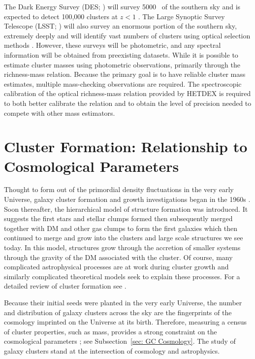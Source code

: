 The Dark Energy Survey (DES; \citealt{DES2005}) will survey 5000 \degsq\ of the southern sky and is expected to detect 100,000 clusters at $z<1$ \citep{DarkEnergySurveyCollaboration2016}. The Large Synoptic Survey Telescope (LSST; \citealt{LSST2012}) will also survey an enormous portion of the southern sky, extremely deeply and will identify vast numbers of clusters using optical selection methods . However, these surveys will be photometric, and any spectral information will be obtained from preexisting datasets. While it is possible to estimate cluster masses using photometric observations, primarily through the richness-mass relation. Because the primary goal is to have reliable cluster mass estimates, multiple mass-checking observations are required. The spectroscopic calibration of the optical richness-mass relation provided by HETDEX is required to both better calibrate the relation and to obtain the level of precision needed to compete with other mass estimators.

\section{Cluster Formation: Relationship to Cosmological Parameters}
Thought to form out of the primordial density fluctuations in the very early Universe, galaxy cluster formation and growth investigations began in the 1960s . Soon thereafter, the hierarchical model of structure formation \citep{Press1974, Gott1975, White1978} was introduced. It suggests the first stars and stellar clumps formed then subsequently merged together with DM and other gas clumps to form the first galaxies which then continued to merge and grow into the clusters and large scale structures we see today. In this model, structures grow through the accretion of smaller systems through the gravity of the DM associated with the cluster. Of course, many complicated astrophysical processes are at work during cluster growth  and similarly complicated theoretical models seek to explain these processes. For a detailed review of cluster formation see \cite{Kravtsov2012}.

Because their initial seeds were planted in the very early Universe, the number and distribution of galaxy clusters across the sky are the fingerprints of the cosmology imprinted on the Universe at its birth. Therefore, measuring a census of cluster properties, such as mass, provides a strong constraint on the cosmological parameters ; see Subsection~\ref{sec: GC Cosmology}. The study of galaxy clusters stand at the intersection of cosmology and astrophysics. 

